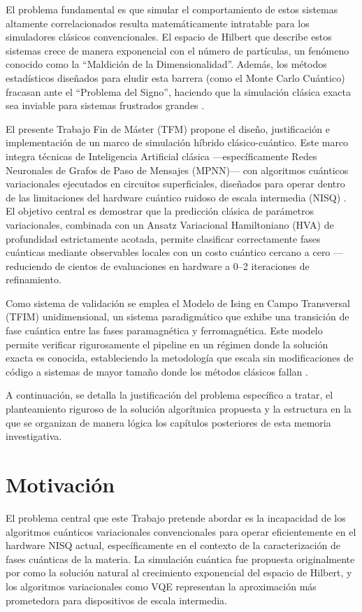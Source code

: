 \documentclass[11pt,a4paper,spanish]{book}
\begin{document}
El problema fundamental es que simular el comportamiento de estos sistemas altamente correlacionados resulta matemáticamente intratable para los simuladores clásicos convencionales. El espacio de Hilbert que describe estos sistemas crece de manera exponencial con el número de partículas, un fenómeno conocido como la ``Maldición de la Dimensionalidad''. Además, los métodos estadísticos diseñados para eludir esta barrera (como el Monte Carlo Cuántico) fracasan ante el ``Problema del Signo'', haciendo que la simulación clásica exacta sea inviable para sistemas frustrados grandes \citep{troyer2005}.

El presente Trabajo Fin de Máster (TFM) propone el diseño, justificación e implementación de un marco de simulación híbrido clásico-cuántico. Este marco integra técnicas de Inteligencia Artificial clásica ---específicamente Redes Neuronales de Grafos de Paso de Mensajes (MPNN)--- con algoritmos cuánticos variacionales ejecutados en circuitos superficiales, diseñados para operar dentro de las limitaciones del hardware cuántico ruidoso de escala intermedia (NISQ) \citep{preskill2018}. El objetivo central es demostrar que la predicción clásica de parámetros variacionales, combinada con un Ansatz Variacional Hamiltoniano (HVA) de profundidad estrictamente acotada, permite clasificar correctamente fases cuánticas mediante observables locales con un costo cuántico cercano a cero ---reduciendo de cientos de evaluaciones en hardware a 0--2 iteraciones de refinamiento.

Como sistema de validación se emplea el Modelo de Ising en Campo Transversal (TFIM) unidimensional, un sistema paradigmático que exhibe una transición de fase cuántica entre las fases paramagnética y ferromagnética. Este modelo permite verificar rigurosamente el pipeline en un régimen donde la solución exacta es conocida, estableciendo la metodología que escala sin modificaciones de código a sistemas de mayor tamaño donde los métodos clásicos fallan \citep{tripathi2026}.

A continuación, se detalla la justificación del problema específico a tratar, el planteamiento riguroso de la solución algorítmica propuesta y la estructura en la que se organizan de manera lógica los capítulos posteriores de esta memoria investigativa.

\section{Motivación}

El problema central que este Trabajo pretende abordar es la incapacidad de los algoritmos cuánticos variacionales convencionales para operar eficientemente en el hardware NISQ actual, específicamente en el contexto de la caracterización de fases cuánticas de la materia. La simulación cuántica fue propuesta originalmente por \citet{feynman1982} como la solución natural al crecimiento exponencial del espacio de Hilbert, y los algoritmos variacionales como VQE \citep{peruzzo2014} representan la aproximación más prometedora para dispositivos de escala intermedia.
\end{document}
